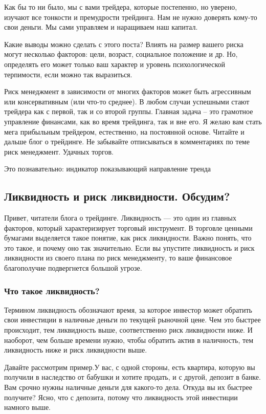\documentclass[a5paper]{article}
\begin{document}
Как бы то ни было, мы с вами трейдера, которые постепенно, но уверено, изучают все тонкости и премудрости трейдинга. Нам не нужно доверять кому-то свои деньги. Мы сами управляем и наращиваем наш капитал.

Какие выводы можно сделать с этого поста? Влиять на размер вашего риска могут несколько факторов: цели, возраст, социальное положение и др. Но, определять его может только ваш характер и уровень психологической терпимости, если можно так выразиться.

Риск менеджмент в зависимости от многих факторов может быть агрессивным или консервативным (или что-то среднее). В любом случаи успешными стают трейдера как с первой, так и со второй группы. Главная задача – это грамотное управление финансами, как во время трейдинга, так и вне его. Я желаю вам стать мега прибыльным трейдером, естественно, на постоянной основе. Читайте и дальше блог о трейдинге. Не забывайте отписываться в комментариях по теме риск менеджмент. Удачных торгов.


Это познавательно: индикатор показывающий направление тренда

\subsection{Ликвидность и риск ликвидности. Обсудим?}

Привет, читатели блога о трейдинге. Ликвидность — это один из главных факторов, который характеризирует торговый инструмент. В торговле ценными бумагами выделяется такое понятие, как риск ликвидности. Важно понять, что это такое, и почему оно так значительно. Если вы упустите ликвидность и риск ликвидности из своего плана по риск менеджменту, то ваше финансовое благополучие подвергнется большой угрозе.

\subsubsection{Что такое ликвидность?}

Термином ликвидность обозначают время, за которое инвестор может обратить свои инвестиции в наличные деньги по текущей рыночной цене. Чем это быстрее происходит, тем ликвидность выше, соответственно риск ликвидности ниже. И наоборот, чем больше времени нужно, чтобы обратить актив в наличность, тем ликвидность ниже и риск ликвидности выше.

Давайте рассмотрим пример.У вас, с одной стороны, есть квартира,
которую вы получили в наследство от бабушки и хотите продать, и с
другой, депозит в банке. Вам срочно нужны наличные деньги для
какого-то дела. Откуда вы их быстрее получите? Ясно, что с депозита,
потому что ликвидность этой инвестиции намного выше.
\end{document}
